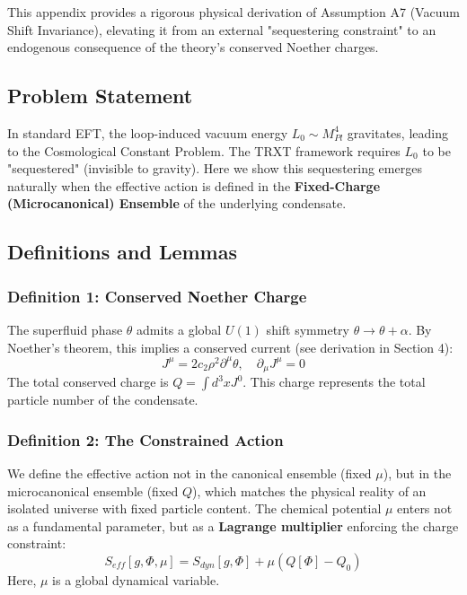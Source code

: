 \documentclass[a4paper,12pt]{article}
\begin{document}
This appendix provides a rigorous physical derivation of Assumption A7 (Vacuum Shift Invariance), elevating it from an external "sequestering constraint" to an endogenous consequence of the theory's conserved Noether charges.

\subsection{Problem Statement}
In standard EFT, the loop-induced vacuum energy $L_0 \sim M_{Pl}^4$ gravitates, leading to the Cosmological Constant Problem. The TRXT framework requires $L_0$ to be "sequestered" (invisible to gravity). Here we show this sequestering emerges naturally when the effective action is defined in the \textbf{Fixed-Charge (Microcanonical) Ensemble} of the underlying condensate.

\subsection{Definitions and Lemmas}

\subsubsection{Definition 1: Conserved Noether Charge}
The superfluid phase $\theta$ admits a global $U(1)$ shift symmetry $\theta \to \theta + \alpha$. By Noether's theorem, this implies a conserved current (see derivation in Section 4):
\begin{equation}
    J^\mu = 2c_2 \rho^2 \partial^\mu \theta, \quad \partial_\mu J^\mu = 0
\end{equation}
The total conserved charge is $Q = \int d^3x J^0$. This charge represents the total particle number of the condensate.

\subsubsection{Definition 2: The Constrained Action}
We define the effective action not in the canonical ensemble (fixed $\mu$), but in the microcanonical ensemble (fixed $Q$), which matches the physical reality of an isolated universe with fixed particle content. The chemical potential $\mu$ enters not as a fundamental parameter, but as a \textbf{Lagrange multiplier} enforcing the charge constraint:
\begin{equation}
    S_{eff}[g, \Phi, \mu] = S_{dyn}[g, \Phi] + \mu(Q[\Phi] - Q_0)
\end{equation}
Here, $\mu$ is a global dynamical variable.
\end{document}
